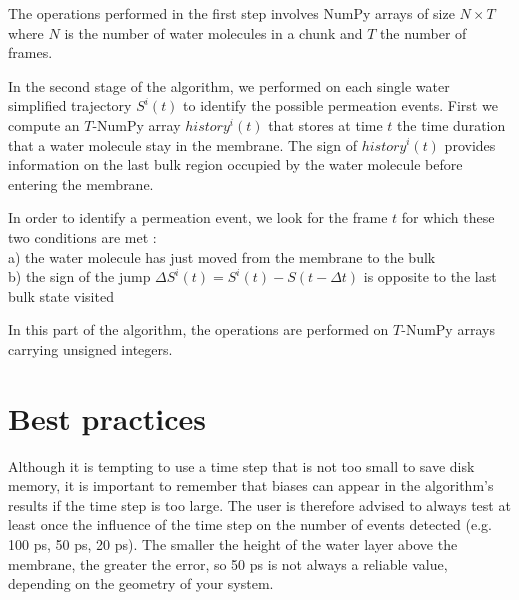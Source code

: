 \documentclass{article}
\begin{document}
The operations performed in the first step involves NumPy arrays of size $N\times T$ where $N$ is the number of water molecules in a chunk and $T$ the number of frames.

In the second stage of the algorithm, we performed on each single water simplified trajectory $S^i(t)$ to identify the possible permeation events. First we compute an $T$-NumPy array $history^i(t)$ that stores at time $t$ the time duration that a water molecule stay in the membrane. The sign of $history^i(t)$ provides information on the last bulk region occupied by the water molecule before entering the membrane.

In order to identify a permeation event, we look for the frame $t$ for which these two conditions are met :\\
a) the water molecule has just moved from the membrane to the bulk \\
b) the sign of the jump $\Delta S^i(t) = S^i(t) - S(t - \Delta t)$ is opposite to the last bulk state visited

In this part of the algorithm, the operations are performed on $T$-NumPy arrays carrying unsigned integers.

\section{Best practices}
\label{sec:best_practices}

Although it is tempting to use a time step that is not too small to save disk memory, it is important to remember that biases can appear in the algorithm's results if the time step is too large. The user is therefore advised to always test at least once the influence of the time step on the number of events detected (e.g. 100 ps, 50 ps, 20 ps). The smaller the height of the water layer above the membrane, the greater the error, so 50 ps is not always a reliable value, depending on the geometry of your system.
\end{document}
